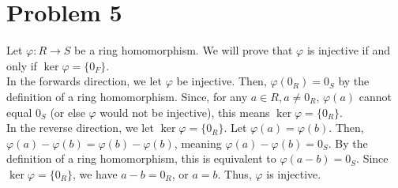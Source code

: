 \documentclass[10pt]{extarticle}
\begin{document}
  \section{Problem 5}%
  Let $\varphi: R\rightarrow S$ be a ring homomorphism. We will prove that $\varphi$ is injective if and only if $\ker \varphi = \{0_F\}$.\\

  In the forwards direction, we let $\varphi$ be injective. Then, $\varphi(0_R) = 0_S$ by the definition of a ring homomorphism. Since, for any $a \in R, a\neq 0_R$, $\varphi(a)$ cannot equal $0_S$ (or else $\varphi$ would not be injective), this means $\ker\varphi = \{0_R\}$.\\

  In the reverse direction, we let $\ker\varphi = \{0_R\}$. Let $\varphi(a) = \varphi(b)$. Then, $\varphi(a) - \varphi(b) = \varphi(b) - \varphi(b)$, meaning $\varphi(a) - \varphi(b) = 0_S$. By the definition of a ring homomorphism, this is equivalent to $\varphi(a-b) = 0_S$. Since $\ker\varphi = \{0_R\}$, we have $a-b = 0_R$, or $a = b$. Thus, $\varphi$ is injective.
\end{document}

